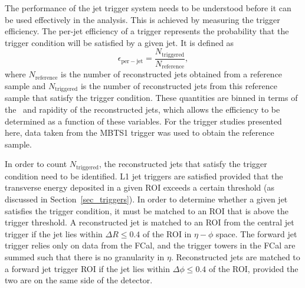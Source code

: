 





The performance of the jet trigger system needs to be understood before it can be used effectively in the analysis. This  is achieved by measuring the trigger efficiency. The per-jet efficiency of a trigger represents the probability that the trigger condition will be satisfied by a given jet. It is defined as 
\begin{equation}
\epsilon_\mathrm{per-jet} = \frac{N_\mathrm{triggered}}{N_\mathrm{reference}} ,
\end{equation}
where $N_\mathrm{reference}$ is the number of reconstructed jets obtained from a reference sample and $N_\mathrm{triggered}$ is the number of reconstructed jets from this reference sample that satisfy the trigger condition. These quantities are binned in terms of the \pt~and rapidity of the reconstructed jets, which allows the efficiency to be determined as a function of these variables. For the trigger studies presented here, data taken from the MBTS1 trigger was used to obtain the reference sample.

In order to count $N_\mathrm{triggered}$, the reconstructed jets that satisfy the trigger condition need to be identified. L1 jet triggers are satisfied provided that the transverse energy deposited in a given ROI exceeds a certain threshold (as discussed in Section~\ref{sec_triggers}). In order to determine whether a given jet satisfies the trigger condition, it must be matched to an ROI that is above the trigger threshold. A reconstructed jet is matched to an ROI from the central jet trigger if the jet lies within $\Delta R \leq 0.4$ of the ROI in $\eta-\phi$ space. The forward jet trigger relies only on data from the FCal, and the trigger towers in the FCal are summed such that there is no granularity in $\eta$. Reconstructed jets are matched to a forward jet trigger ROI if the jet lies within $\Delta \phi \leq 0.4$ of the ROI, provided the two are on the same side of the detector.

